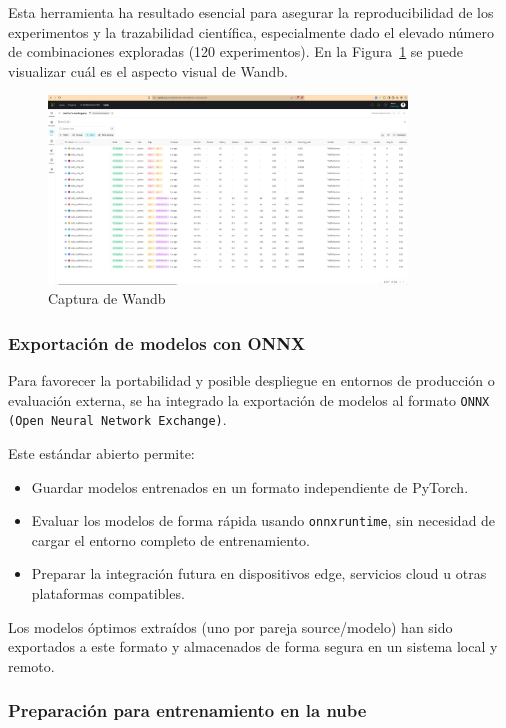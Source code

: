 Esta herramienta ha resultado esencial para asegurar la reproducibilidad de los experimentos y la trazabilidad científica, especialmente dado el elevado número de combinaciones exploradas (120 experimentos). En la Figura~\ref{fig:capt_wandb} se puede visualizar cuál es el aspecto visual de Wandb.

\begin{figure}[H]
	\centering
	\includegraphics[width=0.85\textwidth]{includes/cap5/captura_wandb.png}
	\caption{Captura de Wandb}
	\label{fig:capt_wandb}
\end{figure}

\subsubsection*{Exportación de modelos con ONNX}

Para favorecer la portabilidad y posible despliegue en entornos de producción o evaluación externa, se ha integrado la exportación de modelos al formato \texttt{ONNX (Open Neural Network Exchange)}.

Este estándar abierto permite:
\begin{itemize}
	\item Guardar modelos entrenados en un formato independiente de PyTorch.
	\item Evaluar los modelos de forma rápida usando \texttt{onnxruntime}, sin necesidad de cargar el entorno completo de entrenamiento.
	\item Preparar la integración futura en dispositivos edge, servicios cloud u otras plataformas compatibles.
\end{itemize}

Los modelos óptimos extraídos (uno por pareja source/modelo) han sido exportados a este formato y almacenados de forma segura en un sistema local y remoto.

\subsubsection*{Preparación para entrenamiento en la nube}

